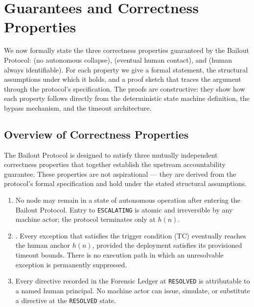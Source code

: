 \section{Guarantees and Correctness Properties}\label{sec:properties}

We now formally state the three correctness properties guaranteed by the Bailout Protocol: \SAFETY{} (no autonomous collapse), \LIVENESS{} (eventual human contact), and \ACCOUNTABILITY{} (human always identifiable). For each property we give a formal statement, the structural assumptions under which it holds, and a proof sketch that traces the argument through the protocol's specification. The proofs are constructive: they show how each property follows directly from the deterministic state machine definition, the bypass mechanism, and the timeout architecture.

\subsection{Overview of Correctness Properties}

The Bailout Protocol is designed to satisfy three mutually independent correctness properties that together establish the upstream accountability guarantee. These properties are not aspirational — they are derived from the protocol's formal specification and hold under the stated structural assumptions.

\begin{enumerate}
\item[\textbf{SAFETY.}] No \bxthree{} node may remain in a state of autonomous operation after entering the Bailout Protocol. Entry to \texttt{ESCALATING} is atomic and irreversible by any machine actor; the protocol terminates only at $h(n)$.

\item[\textbf{LIVENESS.}]. Every exception that satisfies the trigger condition (TC) eventually reaches the human anchor $h(n)$, provided the deployment satisfies its provisioned timeout bounds. There is no execution path in which an unresolvable exception is permanently suppressed.

\item[\textbf{ACCOUNTABILITY.}] Every directive recorded in the Forensic Ledger at \texttt{RESOLVED} is attributable to a named human principal. No machine actor can issue, simulate, or substitute a directive at the \texttt{RESOLVED} state.
\end{enumerate}

